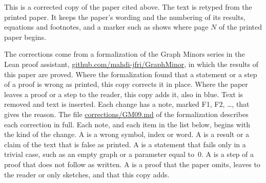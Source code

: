 
This is a corrected copy of the paper cited above. The text is retyped from the printed paper.
It keeps the paper's wording and the numbering of its results, equations and footnotes, and a
marker such as  shows where page $N$ of the printed paper begins.

The corrections come from a formalization of the Graph Minors series in the Lean proof
assistant, \href{https://github.com/mahdi-jfri/GraphMinor}{github.com/mahdi-jfri/GraphMinor},
in which the results of this paper are proved. Where the formalization found that a statement
or a step of a proof is wrong as printed, this copy corrects it in place. Where the paper leaves a proof or a step to the reader, this copy adds it, also in blue. Text  is removed and text  is inserted. Each change has a note, marked
\textcolor{fixcolor}{\sffamily F1}, \textcolor{fixcolor}{\sffamily F2}, \dots, that gives the
reason. The file
\href{https://github.com/mahdi-jfri/GraphMinor/blob/main/corrections/GM09.md}{corrections/GM09.md}
of the formalization describes each correction in full. Each note, and each item in the list below, begins with the kind of the change. A  is a wrong symbol, index or word. A  is a result or a claim of the text that is false as printed. A  is a statement that fails only in a trivial case, such as an empty graph or a parameter equal to~$0$. A  is a step of a proof that does not follow as written. A  is a proof that the paper omits, leaves to the reader or only sketches, and that this copy adds.

